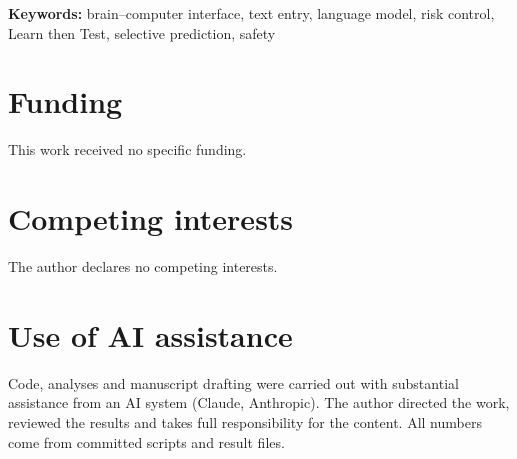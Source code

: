 \documentclass[11pt,a4paper]{article}
\title{\papertitle}
\author{Zibo Zhang\\[2pt] \normalsize Independent researcher}
\date{}
\begin{document}
\maketitle


\noindent\textbf{Keywords:} brain--computer interface, text entry, language model, risk control, Learn then Test, selective prediction, safety
\medskip











\section*{Funding}
This work received no specific funding.

\section*{Competing interests}
The author declares no competing interests.

\section*{Use of AI assistance}
Code, analyses and manuscript drafting were carried out with substantial assistance from an AI system (Claude, Anthropic). The author directed the work, reviewed the results and takes full responsibility for the content. All numbers come from committed scripts and result files.




\appendix

\end{document}
